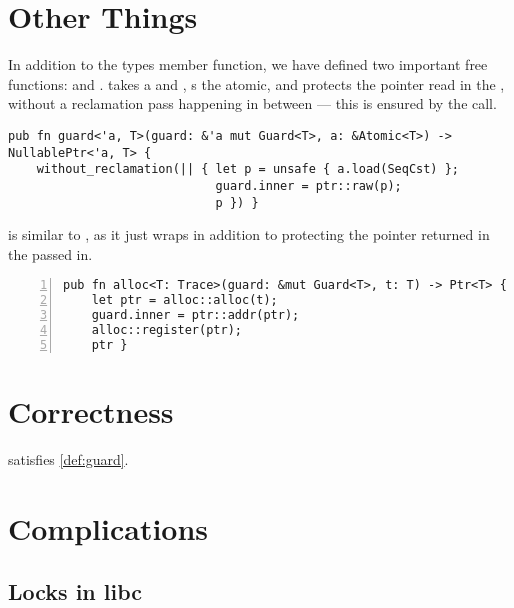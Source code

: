 

\section{Other Things}

In addition to the types member function, we have defined two important free functions:
 and .
 takes a  and , s the atomic, and protects
the pointer read in the , without a reclamation pass happening in between --- this is
ensured by the  call.

\begin{lstlisting}[style=Rust]
pub fn guard<'a, T>(guard: &'a mut Guard<T>, a: &Atomic<T>) -> NullablePtr<'a, T> {
    without_reclamation(|| { let p = unsafe { a.load(SeqCst) };
                             guard.inner = ptr::raw(p);
                             p }) }
\end{lstlisting}
 is similar to , as it just wraps  in addition
to protecting the pointer returned in the  passed in.
\begin{lstlisting}[style=Rust,numbers=left, numberstyle=\color{gray}\ttfamily{}A]
pub fn alloc<T: Trace>(guard: &mut Guard<T>, t: T) -> Ptr<T> {
    let ptr = alloc::alloc(t);
    guard.inner = ptr::addr(ptr);
    alloc::register(ptr);
    ptr }
\end{lstlisting}


\section{Correctness}

\begin{claim}
   satisfies \cref{def:guard}.
\end{claim}






\section{Complications}

\subsection{Locks in libc\label{sec:alloc-lock}}

